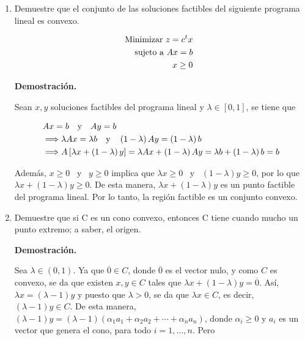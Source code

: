 \documentclass[fleqn, 12pt]{article}
\begin{document}
\begin{enumerate}
		\item Demuestre que el conjunto de las soluciones factibles del siguiente programa lineal es convexo.
		
		\begin{center}
			\begin{minipage}{4cm}
				\begin{align*}
					\textnormal{Minimizar } z = c^t x & \phantom{1} \\
					\textnormal{sujeto a } Ax = b & \phantom{2} \\
					x \geq 0 & \phantom{3}
				\end{align*}
			\end{minipage}
		\end{center}

		\textbf{Demostración.}

		Sean $ x, y $ soluciones factibles del programa lineal y $ \lambda \in \left[ 0,1 \right] $, se tiene que

		\begin{align*}
			& Ax = b \quad \textnormal{y} \quad Ay = b \\
			& \Longrightarrow \lambda Ax = \lambda b \quad \textnormal{y} \quad \left( 1 - \lambda \right) Ay = \left( 1 - \lambda \right) b \\
			& \Longrightarrow A \left[ \lambda x + \left( 1 - \lambda \right) y \right] = \lambda Ax + \left( 1 - \lambda \right) Ay = \lambda b + \left( 1 - \lambda \right) b = b 
		\end{align*}

		Además, $ x \geq 0 $ \, y \, $ y \geq 0 $ implica que $ \lambda x \geq 0 $ \, y \, $ \left( 1 - \lambda \right) y \geq 0 $, por lo que $ \lambda x + \left( 1 - \lambda \right) y \geq 0 $. De esta manera, $ \lambda x + \left( 1 - \lambda \right) y $ es un punto factible del programa lineal. Por lo tanto, la región factible es un conjunto convexo.

		\item Demuestre que si C es un cono convexo, entonces C tiene cuando mucho un punto extremo; a saber, el origen.
		
		\textbf{Demostración.}

		Sea $ \lambda \in \left( 0,1 \right) $. Ya que $ \overline{0} \in C $, donde $ \overline{0} $ es el vector nulo, y como $ C $ es convexo, se da que existen $ x, y \in C $ tales que $ \lambda x + \left( 1 - \lambda \right) y = \overline{0} $. Así, $ \lambda x = \left( \lambda - 1 \right) y $ y puesto que $ \lambda > 0 $, se da que $ \lambda x \in C $, es decir, $ \left( \lambda - 1 \right) y \in C $. De esta manera, $ \left( \lambda - 1 \right) y = \left( \lambda - 1 \right) \left( \alpha_1 a_1 + \alpha_2 a_2 + \cdots + \alpha_n a_n \right) $, donde $ \alpha_i \geq 0 $ y $ a_i $ es un vector que genera el cono, para todo $ i = 1, \ldots, n $. Pero 
		

\end{enumerate}
\end{document}
